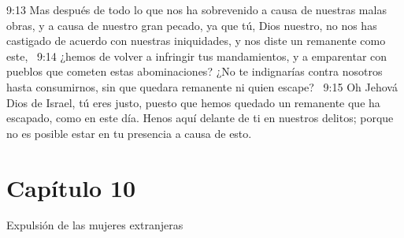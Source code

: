 9:13 Mas después de todo lo que nos ha sobrevenido a causa de nuestras malas obras, y a causa de nuestro gran pecado, ya que tú, Dios nuestro, no nos has castigado de acuerdo con nuestras iniquidades, y nos diste un remanente como este,  
9:14 ¿hemos de volver a infringir tus mandamientos, y a emparentar con pueblos que cometen estas abominaciones? ¿No te indignarías contra nosotros hasta consumirnos, sin que quedara remanente ni quien escape?  
9:15 Oh Jehová Dios de Israel, tú eres justo, puesto que hemos quedado un remanente que ha escapado, como en este día. Henos aquí delante de ti en nuestros delitos; porque no es posible estar en tu presencia a causa de esto.  
\section*{Capítulo 10 }
Expulsión de las mujeres extranjeras  

